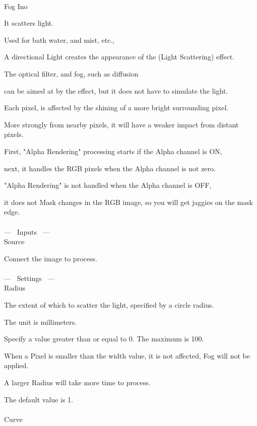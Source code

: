 \documentclass[a4paper,12pt]{article}
\begin{document}
\thispagestyle{empty}

\Large
\noindent \\
Fog Ino\medskip
\par
\normalsize
It scatters light.\\
\par
Used for bath water, and mist, etc.,\par
A directional Light creates the appearance of the (Light Scattering) effect.\par
The optical filter, and fog, such as diffusion\par
can be aimed at by the effect, but it does not have to simulate the light.\\
\par
Each pixel, is affected by the shining of a more bright surrounding pixel.\par
More strongly from nearby pixels, it will have a weaker impact from distant pixels.\\
\par
First, "Alpha Rendering" processing starts if the Alpha channel is ON,\par
next, it handles the RGB pixels when the Alpha channel is not zero.\\
\par
"Alpha Rendering" is not handled when the Alpha channel is OFF,\par
it does not Mask changes in the RGB image, so you will get jaggies on the mask edge.\\
\\
--- \ Inputs \ ---\\
Source\par
Connect the image to process.\\
\\
--- \ Settings \ ---\\
Radius\par
The extent of which to scatter the light, specified by a circle radius.\par
The unit is millimeters.\par
Specify a value greater than or equal to 0. The maximum is 100.\par
When a Pixel is smaller than the width value, it is not affected, Fog will not be applied.\par
A larger Radius will take more time to process.\par
The default value is 1.\\
\\
Curve\par
\end{document}
